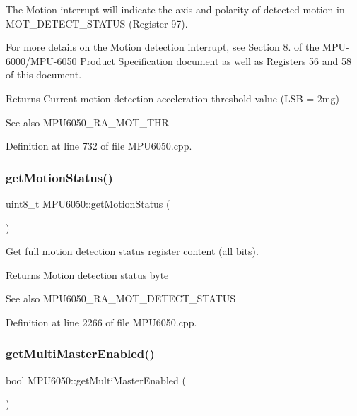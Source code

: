 The Motion interrupt will indicate the axis and polarity of detected motion in M\+O\+T\+\_\+\+D\+E\+T\+E\+C\+T\+\_\+\+S\+T\+A\+T\+US (Register 97).

For more details on the Motion detection interrupt, see Section 8. of the M\+P\+U-\/6000/\+M\+P\+U-\/6050 Product Specification document as well as Registers 56 and 58 of this document.

\begin{DoxyReturn}{Returns}
Current motion detection acceleration threshold value (L\+SB = 2mg) 
\end{DoxyReturn}
\begin{DoxySeeAlso}{See also}
M\+P\+U6050\+\_\+\+R\+A\+\_\+\+M\+O\+T\+\_\+\+T\+HR 
\end{DoxySeeAlso}


Definition at line 732 of file M\+P\+U6050.\+cpp.

\mbox{\label{classMPU6050_af6e4fd231a9db99bd4270cf640eeae46}} 
\subsubsection{\texorpdfstring{getMotionStatus()}{getMotionStatus()}}
{\footnotesize\ttfamily uint8\+\_\+t M\+P\+U6050\+::get\+Motion\+Status (\begin{DoxyParamCaption}{ }\end{DoxyParamCaption})}



Get full motion detection status register content (all bits). 

\begin{DoxyReturn}{Returns}
Motion detection status byte 
\end{DoxyReturn}
\begin{DoxySeeAlso}{See also}
M\+P\+U6050\+\_\+\+R\+A\+\_\+\+M\+O\+T\+\_\+\+D\+E\+T\+E\+C\+T\+\_\+\+S\+T\+A\+T\+US 
\end{DoxySeeAlso}


Definition at line 2266 of file M\+P\+U6050.\+cpp.

\mbox{\label{classMPU6050_aa88483068837bd9bc9c9f6c59a7a79b7}} 
\subsubsection{\texorpdfstring{getMultiMasterEnabled()}{getMultiMasterEnabled()}}
{\footnotesize\ttfamily bool M\+P\+U6050\+::get\+Multi\+Master\+Enabled (\begin{DoxyParamCaption}{ }\end{DoxyParamCaption})}



